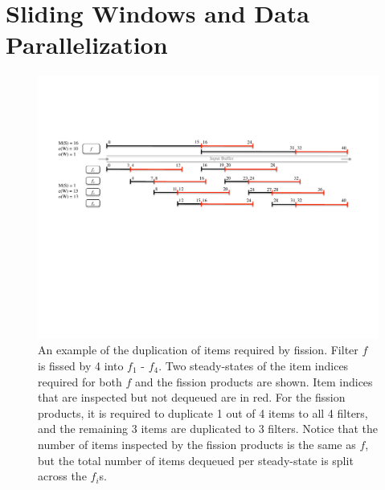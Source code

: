 \section{Sliding Windows and Data Parallelization}

\begin{figure}[t]
\centering
\includegraphics[width=6.0in]{figures/fission-sharing.pdf}
\caption[An example of the sharing required by fission.]  { An
  example of the duplication of items required by fission.  Filter $f$
  is fissed by 4 into $f_1$ - $f_4$.  Two steady-states of the item
  indices required for both $f$ and the fission products are shown.
  Item indices that are inspected but not dequeued are in red.  For the
  fission products, it is required to duplicate 1 out of 4 items to
  all 4 filters, and the remaining 3 items are duplicated to 3
  filters.  Notice that the number of items inspected by the fission
  products is the same as $f$, but the total number of items dequeued 
per steady-state is split across the $f_i$s.
\label{fig:fission-sharing}}
\end{figure}


